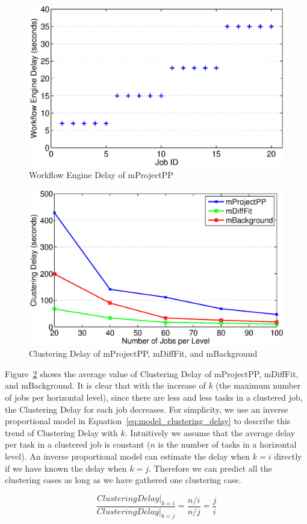 \begin{figure}

\centering
  \includegraphics[width=0.9\linewidth]{figures/model/montage_one_run.eps}
    \caption{Workflow Engine Delay of mProjectPP}
    \label{fig:model_montage_one_run}
\end{figure}%
\begin{figure}
  \centering
  \includegraphics[width=0.9\linewidth]{figures/model/montage_clustering_delay.eps}
    \caption{Clustering Delay of mProjectPP, mDiffFit, and mBackground}
    \label{fig:model_montage_clustering}
\end{figure}





Figure~\ref{fig:model_montage_clustering} shows the average value of Clustering Delay of mProjectPP, mDiffFit, and mBackground. It is clear that with the increase of $k$ (the maximum number of jobs per horizontal level), since there are less and less tasks in a clustered job, the Clustering Delay for each job decreases. For simplicity, we use an inverse proportional model in Equation~\ref{eq:model_clustering_delay} to describe this trend of Clustering Delay with $k$. Intuitively we assume that the average delay per task in a clustered job is constant ($n$ is the number of tasks in a horizontal level). An inverse proportional model can estimate the delay when $k=i$ directly if we have known the delay when $k=j$. Therefore we can predict all the clustering cases as long as we have gathered one clustering case. 

\begin{equation} \label{eq:model_clustering_delay}
\frac{Clustering Delay|_{k=i}}{Clustering Delay|_{k=j}}=\frac{n/i}{n/j}=\frac{j}{i}
\end{equation}




